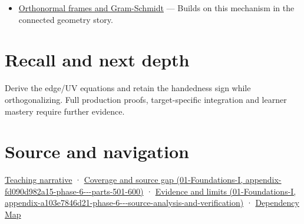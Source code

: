 \begin{itemize}
\tightlist
\item
  \hyperref[appendix-c39f1ed34271]{Orthonormal frames and Gram-Schmidt} --- Builds on this mechanism in the connected geometry story.
\end{itemize}

\section{Recall and next depth}\label{appendix-e31893dec985-recall-and-next-depth}

Derive the edge/UV equations and retain the handedness sign while orthogonalizing. Full production proofs, target-specific integration and learner mastery require further evidence.

\section{Source and navigation}\label{appendix-e31893dec985-source-and-navigation}

\href{Continuous\%20Notes/Computing\%20Foundations\%20-\%20From\%20Bits\%20to\%20C++\%20and\%20Systems\%20APIs\#Surface\%20movement\%20becomes\%20a\%20local\%20frame}{Teaching narrative} · \href{../01-Foundations-I/main.pdf\#nameddest=appendix-fd090d982a15-phase-6---parts-501-600}{Coverage and source gap (01-Foundations-I, appendix-fd090d982a15-phase-6-\/-\/-parts-501-600)} · \href{../01-Foundations-I/main.pdf\#nameddest=appendix-a103e7846d21-phase-6---source-analysis-and-verification}{Evidence and limits (01-Foundations-I, appendix-a103e7846d21-phase-6-\/-\/-source-analysis-and-verification)} · \hyperref[appendix-4ad47bdd269a]{Dependency Map}
